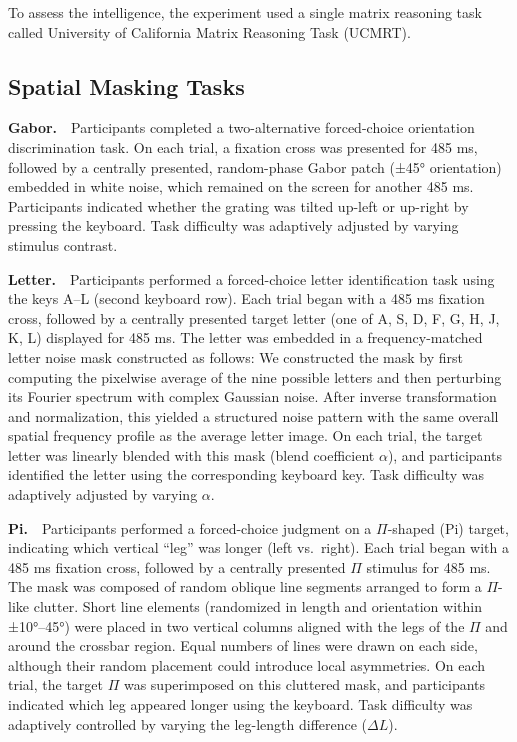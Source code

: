 \documentclass[
  ,man]{apa6}
\begin{document}
To assess the intelligence, the experiment used a single matrix reasoning task called University of California Matrix Reasoning Task (UCMRT).

\subsection{Spatial Masking Tasks}\label{spatial-masking-tasks}

\textbf{Gabor.}\(\quad\)Participants completed a two-alternative forced-choice orientation discrimination task. On each trial, a fixation cross was presented for 485 ms, followed by a centrally presented, random-phase Gabor patch (±45° orientation) embedded in white noise, which remained on the screen for another 485 ms. Participants indicated whether the grating was tilted up-left or up-right by pressing the keyboard. Task difficulty was adaptively adjusted by varying stimulus contrast.

\textbf{Letter.}\(\quad\)Participants performed a forced-choice letter identification task using the keys A--L (second keyboard row). Each trial began with a 485 ms fixation cross, followed by a centrally presented target letter (one of A, S, D, F, G, H, J, K, L) displayed for 485 ms. The letter was embedded in a frequency-matched letter noise mask constructed as follows: We constructed the mask by first computing the pixelwise average of the nine possible letters and then perturbing its Fourier spectrum with complex Gaussian noise. After inverse transformation and normalization, this yielded a structured noise pattern with the same overall spatial frequency profile as the average letter image. On each trial, the target letter was linearly blended with this mask (blend coefficient \(\alpha\)), and participants identified the letter using the corresponding keyboard key. Task difficulty was adaptively adjusted by varying \(\alpha\).

\textbf{Pi.}\(\quad\)Participants performed a forced-choice judgment on a \(\Pi\)-shaped (Pi) target, indicating which vertical ``leg'' was longer (left vs.~right). Each trial began with a 485 ms fixation cross, followed by a centrally presented \(\Pi\) stimulus for 485 ms. The mask was composed of random oblique line segments arranged to form a \(\Pi\)-like clutter. Short line elements (randomized in length and orientation within ±10°--45°) were placed in two vertical columns aligned with the legs of the \(\Pi\) and around the crossbar region. Equal numbers of lines were drawn on each side, although their random placement could introduce local asymmetries. On each trial, the target \(\Pi\) was superimposed on this cluttered mask, and participants indicated which leg appeared longer using the keyboard. Task difficulty was adaptively controlled by varying the leg-length difference (\(\Delta L\)).
\end{document}
